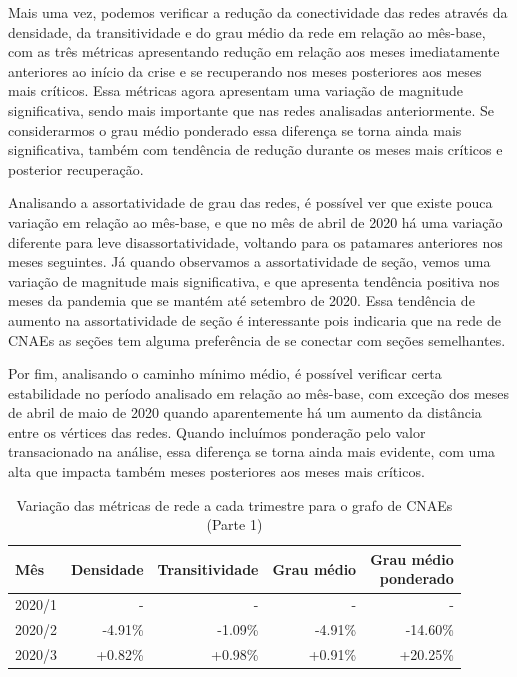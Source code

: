 Mais uma vez, podemos verificar a redução da conectividade das redes através da densidade, da transitividade e do grau médio da rede em relação ao mês-base, com as três métricas apresentando redução em relação aos meses imediatamente anteriores ao início da crise e se recuperando nos meses posteriores aos meses mais críticos. Essa métricas agora apresentam uma variação de magnitude significativa, sendo mais importante que nas redes analisadas anteriormente. Se considerarmos o grau médio ponderado essa diferença se torna ainda mais significativa, também com tendência de redução durante os meses mais críticos e posterior recuperação.

Analisando a assortatividade de grau das redes, é possível ver que existe pouca variação em relação ao mês-base, e que no mês de abril de 2020 há uma variação diferente para leve disassortatividade, voltando para os patamares anteriores nos meses seguintes. Já quando observamos a assortatividade de seção, vemos uma variação de magnitude mais significativa, e que apresenta tendência positiva nos meses da pandemia que se mantém até setembro de 2020. Essa tendência de aumento na assortatividade de seção é interessante pois indicaria que na rede de CNAEs as seções tem alguma preferência de se conectar com seções semelhantes.

Por fim, analisando o caminho mínimo médio, é possível verificar certa estabilidade no período analisado em relação ao mês-base, com exceção dos meses de abril de maio de 2020 quando aparentemente há um aumento da distância entre os vértices das redes. Quando incluímos ponderação pelo valor transacionado na análise, essa diferença se torna ainda mais evidente, com uma alta que impacta também meses posteriores aos meses mais críticos.

\begin{table}[htb]
\centering
\caption{Variação das métricas de rede a cada trimestre para o grafo de CNAEs (Parte 1)}
\label{tab:metricas-redes-pandemia:grafo-trimestral-por-cnae1}
\begin{tabular}{l|rrrr}
\toprule
Mês & Densidade & Transitividade & Grau médio & \shortstack{Grau médio\\ponderado} \\
\midrule
2020/1 & - & - & - & - \\
2020/2 & -4.91\% & -1.09\% & -4.91\% & -14.60\% \\
2020/3 & +0.82\% & +0.98\% & +0.91\% & +20.25\% \\
\bottomrule
\end{tabular}
\fdadospesquisa
\end{table}

